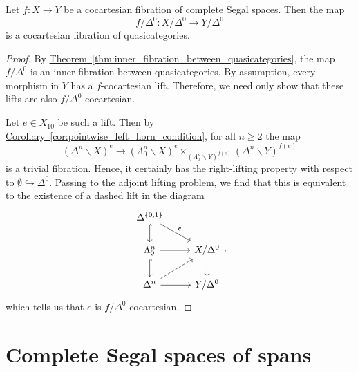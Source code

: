 \documentclass[main.tex]{subfiles}
\begin{document}
\begin{corollary}
  \label{cor:cocart_fib_between_css_gives_cocart_fib_of_quasicats}
  Let $f\colon X \to Y$ be a cocartesian fibration of complete Segal spaces. Then the map
  \begin{equation*}
    f/\Delta^{0}\colon X/\Delta^{0} \to Y/\Delta^{0}
  \end{equation*}
  is a cocartesian fibration of quasicategories.
\end{corollary}
\begin{proof}
  By \hyperref[thm:inner_fibration_between_quasicategories]{Theorem~\ref*{thm:inner_fibration_between_quasicategories}}, the map $f/\Delta^{0}$ is an inner fibration between quasicategories. By assumption, every morphism in $Y$ has a $f$-cocartesian lift. Therefore, we need only show that these lifts are also $f / \Delta^{0}$-cocartesian.

  Let $e \in X_{10}$ be such a lift. Then by \hyperref[cor:pointwise_left_horn_condition]{Corollary~\ref*{cor:pointwise_left_horn_condition}}, for all $n \geq 2$ the map
  \begin{equation*}
    (\Delta^{n} \backslash X)^{e} \to (\Lambda^{n}_{0} \backslash X)^{e} \times_{(\Lambda^{n}_{0} \backslash Y)^{f(e)}} (\Delta^{n} \backslash Y)^{f(e)}
  \end{equation*}
  is a trivial fibration. Hence, it certainly has the right-lifting property with respect to $\emptyset \hookrightarrow \Delta^{0}$. Passing to the adjoint lifting problem, we find that this is equivalent to the existence of a dashed lift in the diagram
  \begin{equation*}
    \begin{tikzcd}
      \Delta^{\{0, 1\}}
      \arrow[d, hook]
      \arrow[dr, "e"]
      \\
      \Lambda^{n}_{0}
      \arrow[r]
      \arrow[d, hook]
      & X / \Delta^{0}
      \arrow[d]
      \\
      \Delta^{n}
      \arrow[r]
      \arrow[ur, dashed]
      & Y / \Delta^{0}
    \end{tikzcd},
  \end{equation*}
  which tells us that $e$ is $f / \Delta^{0}$-cocartesian.
\end{proof}

\section{Complete Segal spaces of spans}
\label{sec:complete_segal_spaces_of_spans}
\end{document}
